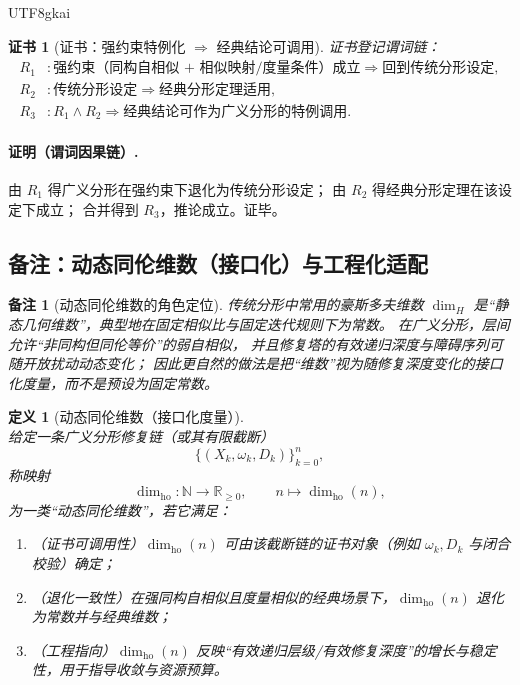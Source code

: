 \documentclass[12pt]{article}
\newtheorem{definition}{定义}[section]
\newtheorem{remark}{备注}[section]
\newtheorem{Certificate}{证书}[section]
\newcommand{\NN}{\mathbb{N}}
\newcommand{\RR}{\mathbb{R}}
\newcommand{\KouJing}{\texorpdfstring{表述约定}{表述约定}}
\begin{document}
\begin{CJK*}{UTF8}{gkai}
\begin{Certificate}[证书：强约束特例化 $\Rightarrow$ 经典结论可调用]
\label{cert:tex29-classical-results-recovered}
证书登记谓词链：
\[
\begin{aligned}
  R_1 &: \text{强约束（同构自相似 + 相似映射/度量条件）成立}\Rightarrow \text{回到传统分形设定},\\
  R_2 &: \text{传统分形设定}\Rightarrow \text{经典分形定理适用},\\
  R_3 &: R_1\wedge R_2\Rightarrow \text{经典结论可作为广义分形的特例调用}.
\end{aligned}
\]
\end{Certificate}

\paragraph{证明（谓词因果链）.}
由 $R_1$ 得广义分形在强约束下退化为传统分形设定；
由 $R_2$ 得经典分形定理在该设定下成立；
合并得到 $R_3$，推论成立。证毕。

\subsection{备注：动态同伦维数（接口化）与工程化适配}
\label{subsec:tex29-dynamic-homotopy-dimension}

\begin{remark}[动态同伦维数的角色定位]
传统分形中常用的豪斯多夫维数 $\dim_H$ 是“静态几何维数”，典型地在固定相似比与固定迭代规则下为常数。
在广义分形，层间允许“非同构但同伦等价”的弱自相似，
并且修复塔的有效递归深度与障碍序列可随开放扰动动态变化；
因此更自然的做法是把“维数”视为随修复深度变化的\emph{接口化度量}，而不是预设为固定常数。
\end{remark}

\begin{definition}[动态同伦维数（接口化度量）]
给定一条广义分形修复链（或其有限截断）
\[
  \bigl\{(X_k,\omega_k,D_k)\bigr\}_{k=0}^{n},
\]
称映射
\[
  \dim_{\mathrm{ho}}:\NN\to\RR_{\ge 0},\qquad
  n\mapsto \dim_{\mathrm{ho}}(n),
\]
为一类“动态同伦维数”，若它满足：
\begin{enumerate}
  \item （证书可调用性）$\dim_{\mathrm{ho}}(n)$ 可由该截断链的证书对象（例如 $\omega_k,D_k$ 与闭合校验）确定；
  \item （退化一致性）在强同构自相似且度量相似的经典场景下，$\dim_{\mathrm{ho}}(n)$ 退化为常数并与经典维数；
  \item （工程指向）$\dim_{\mathrm{ho}}(n)$ 反映“有效递归层级/有效修复深度”的增长与稳定性，用于指导收敛与资源预算。
\end{enumerate}
\end{definition}


\end{CJK*}
\end{document}
